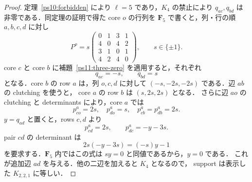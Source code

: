 \begin{proof}
定理~\ref{ps10:forbidden} により $\ell=5$ であり，$K_4$ の禁止により
$q_{ac},q_{bd}$ は非零である．同定理の証明で得た core $o$ の行列を
$\mathbf F_5$ で書くと，列・行の順 $a,b,c,d$ に対し
\[
 P^o=s\begin{pmatrix}
 0&1&3&1\\
 4&0&4&2\\
 3&1&0&1\\
 4&2&4&0
 \end{pmatrix},\qquad s\in\{\pm1\}.
\]
core $c$ と core $b$ に補題~\ref{ps11:three-zero} を適用すると，それぞれ
\[
 q_{ac}=-s,\qquad q_{bd}=s
\]
となる．core $b$ の row $a$ は，列 $o,c,d$ に対して
$(-s,-2s,-2s)$ である．辺 $ab$ の clutching を使うと，
core $a$ の row $b$ は $(s,2s,2s)$ となる．
さらに辺 $ao$ の clutching と determinants により，core $a$ では
\[
 p^a_{co}=2s,\quad p^a_{do}=s,\quad
 p^a_{cb}=p^a_{db}=2s.
\]
$y=q_{ad}$ と置くと，rows $c,d$ より
\[
 p^a_{cd}=2s,\qquad p^a_{dc}=-y-3s.
\]
pair $cd$ の determinant は
\[
 2s(-y-3s)=(-s)y-1
\]
を要求する．$\mathbf F_5$ 内ではこの式は $sy=0$ と同値であるから，$y=0$ である．
これが追加辺 $ad$ を与える．他の二辺を加えると $K_4$ となるので，
support は表示した $K_{2,2,1}$ に等しい．
\end{proof}

